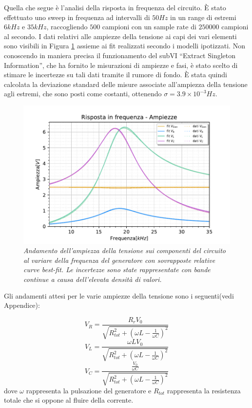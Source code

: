 Quella che segue è l'analisi della risposta in frequenza del circuito.
È stato effettuato uno sweep in frequenza ad intervalli di $50Hz$ in un range di estremi $6kHz$ e $35kHz$, raccogliendo
$500$ campioni con un sample rate di $250000$ campioni al secondo.
I dati relativi alle ampiezze della tensione ai capi dei vari elementi sono visibili in Figura \ref{fig:ampiezzeRLC}
assieme ai fit realizzati secondo i modelli ipotizzati.
Non conoscendo in maniera precisa il funzionamento del subVI ``Extract Singleton Information'', che ha fornito le misurazioni
di ampiezze e fasi, è stato scelto di stimare le incertezze su tali dati tramite il rumore di fondo. È stata quindi
calcolata la deviazione standard delle misure associate all’ampiezza della tensione agli estremi, che sono posti
come costanti, ottenendo $\sigma = 3.9 \times 10^{-3} Hz$.
\begin{figure}[h]
    \centering
    \includegraphics[width=.8\textwidth]{../figs/Risposta-in-frequenza-ampiezze.pdf}
    \caption{\emph{Andamento dell’ampiezza della tensione sui componenti del circuito al variare
    della frequenza del generatore con sovrapposte relative curve best-fit. Le incertezze sono state
    rappresentate con bande continue a causa dell'elevata densità di valori.}}
    \label{fig:ampiezzeRLC}
\end{figure}

Gli andamenti attesi per le varie ampiezze della tensione sono i seguenti(vedi Appendice):

\begin{equation}\label{eq:amp-V_R}
    V_R = \frac{R_rV_0}{\sqrt{ R_{tot}^2 +{ \left(\omega L - \frac{1}{\omega C}\right)}^2}}
\end{equation}
\begin{equation}
    V_L = \frac{\omega L V_0}{\sqrt{R_{tot}^2+{ \left(\omega L - \frac{1}{\omega C}\right)}^2}}
\end{equation}
\begin{equation}
    V_C = \frac{\frac{V_0}{\omega C}}{\sqrt{R_{tot}^2+{ \left(\omega L - \frac{1}{\omega C}\right)}^2}}
\end{equation}
dove $\omega$ rappresenta la pulsazione del generatore e $R_{tot}$ rappresenta la resistenza totale che si oppone al
fluire della corrente.



